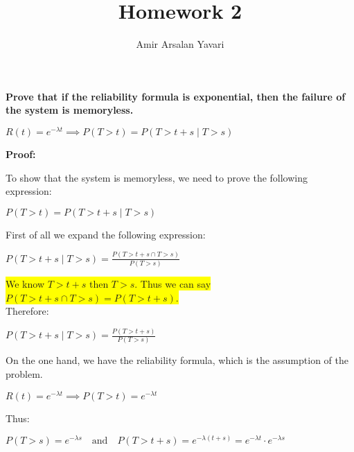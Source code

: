 \documentclass[12pt]{article}
\begin{document}
 
 
\title{Homework 2}
\author{Amir Arsalan Yavari}
\maketitle

\textbf{Prove that if the reliability formula is exponential, then the failure of the system is memoryless.}\\[10pt]

\begin{center}
$R(t) = e^{-\lambda t} \implies P(T > t) = P(T > t+s \mid T > s)$\\[7pt]
\end{center}

\textbf{Proof:}

To show that the system is memoryless, we need to prove the following expression:

\begin{center}
    \( P(T > t) = P(T > t+s \mid T > s) \)
\end{center}

First of all we expand the following expression:

\begin{center}
    \( P(T > t+s \mid T > s) = \frac{P(T > t+s \cap T > s)}{P(T > s)} \)
\end{center}

\colorbox{yellow}{We know \( T > t+s \) then \( T > s \). Thus we can say \( P(T > t+s \cap T > s) = P(T > t+s) \).}
\\

Therefore:

\begin{center}
    \( P(T > t+s \mid T > s) = \frac{P(T > t+s)}{P(T > s)} \)
\end{center}

On the one hand, we have the reliability formula, which is the assumption of the problem.

\begin{center}
    \( R(t) = e^{-\lambda t} \implies P(T > t) = e^{-\lambda t} \)
\end{center}

Thus:

\begin{center}
    \( P(T > s) = e^{-\lambda s} \quad \text{and} \quad P(T > t+s) = e^{-\lambda(t+s)} = e^{-\lambda t} \cdot e^{-\lambda s} \)
\end{center}
\end{document}
